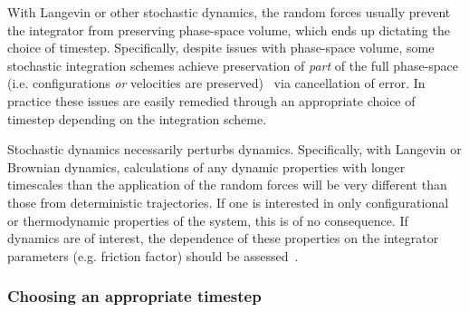 \documentclass[9pt,bestpractices]{livecoms}
\begin{document}
With Langevin or other stochastic dynamics, the random forces usually prevent the integrator from preserving phase-space volume, which ends up dictating the choice of timestep.
Specifically, despite issues with phase-space volume, some stochastic integration schemes achieve preservation of \textit{part} of the full phase-space (i.e. configurations \textit{or} velocities are preserved)~\cite{Fass2018} via cancellation of error.
In practice these issues are easily remedied through an appropriate choice of timestep depending on the integration scheme.

Stochastic dynamics necessarily perturbs dynamics.
Specifically, with Langevin or Brownian dynamics, calculations of any dynamic properties with longer timescales than the application of the random forces will be very different than those from deterministic trajectories.
If one is interested in only configurational or thermodynamic properties of the system, this is of no consequence.
If dynamics are of interest, the dependence of these properties on the integrator parameters (e.g. friction factor) should be assessed~\cite{Basconi:2013:JChemTheoryComput}.


\subsubsection{Choosing an appropriate timestep}
\end{document}

